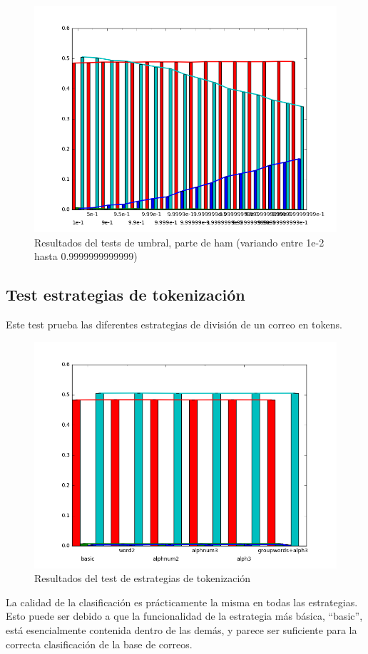 \begin{figure}[hb]
	\centering
	\includegraphics[width=\textwidth, keepaspectratio]{img/threshold2}
	\caption{Resultados del tests de umbral, parte de ham (variando entre
	1e-2 hasta 0.9999999999999)}
	\label{fig:threshold2}
\end{figure}

\clearpage
\subsection{Test estrategias de tokenización}

Este test prueba las diferentes estrategias de división de un correo en tokens.

\begin{figure}[ht]
	\centering
	\includegraphics[width=\textwidth, keepaspectratio]{img/tokens}
	\caption{Resultados del test de estrategias de tokenización}
	\label{fig:tokens}
\end{figure}

La calidad de la clasificación es prácticamente la misma en todas las
estrategias. Esto puede ser debido a que la funcionalidad de la estrategia más
básica, ``basic'', está esencialmente contenida dentro de las demás, y parece
ser suficiente para la correcta clasificación de la base de correos.
